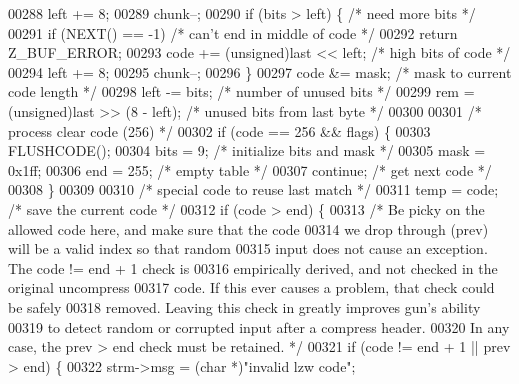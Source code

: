 \begin{DoxyCode}
00288         left += 8;
00289         chunk--;
00290         \textcolor{keywordflow}{if} (bits > left) \{                  \textcolor{comment}{/* need more bits */}
00291             \textcolor{keywordflow}{if} (NEXT() == -1)               \textcolor{comment}{/* can't end in middle of code */}
00292                 \textcolor{keywordflow}{return} Z\_BUF\_ERROR;
00293             code += (unsigned)last << left; \textcolor{comment}{/* high bits of code */}
00294             left += 8;
00295             chunk--;
00296         \}
00297         code &= mask;                       \textcolor{comment}{/* mask to current code length */}
00298         left -= bits;                       \textcolor{comment}{/* number of unused bits */}
00299         rem = (unsigned)last >> (8 - left); \textcolor{comment}{/* unused bits from last byte */}
00300 
00301         \textcolor{comment}{/* process clear code (256) */}
00302         \textcolor{keywordflow}{if} (code == 256 && flags) \{
00303             FLUSHCODE();
00304             bits = 9;                       \textcolor{comment}{/* initialize bits and mask */}
00305             mask = 0x1ff;
00306             end = 255;                      \textcolor{comment}{/* empty table */}
00307             \textcolor{keywordflow}{continue};                       \textcolor{comment}{/* get next code */}
00308         \}
00309 
00310         \textcolor{comment}{/* special code to reuse last match */}
00311         temp = code;                        \textcolor{comment}{/* save the current code */}
00312         \textcolor{keywordflow}{if} (code > end) \{
00313             \textcolor{comment}{/* Be picky on the allowed code here, and make sure that the code}
00314 \textcolor{comment}{               we drop through (prev) will be a valid index so that random}
00315 \textcolor{comment}{               input does not cause an exception.  The code != end + 1 check is}
00316 \textcolor{comment}{               empirically derived, and not checked in the original uncompress}
00317 \textcolor{comment}{               code.  If this ever causes a problem, that check could be safely}
00318 \textcolor{comment}{               removed.  Leaving this check in greatly improves gun's ability}
00319 \textcolor{comment}{               to detect random or corrupted input after a compress header.}
00320 \textcolor{comment}{               In any case, the prev > end check must be retained. */}
00321             \textcolor{keywordflow}{if} (code != end + 1 || prev > end) \{
00322                 strm->msg = (\textcolor{keywordtype}{char} *)\textcolor{stringliteral}{"invalid lzw code"};

\end{DoxyCode}
